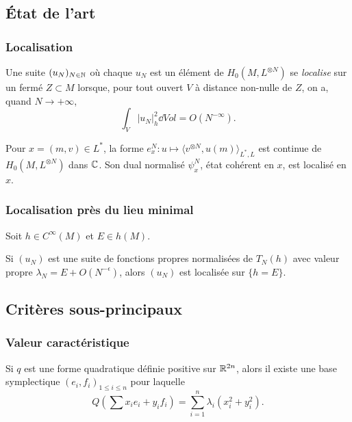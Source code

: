 \documentclass[mathserif]{beamer}
\begin{document}
\subsection{\'Etat de l'art}
\begin{frame}
  \frametitle{Localisation}
  \begin{defn}
    Une suite $(u_N)_{N\in \mathbb{N}}$ où chaque $u_N$ est un élément de
    $H_0(M,L^{\otimes N})$ se \emph{localise} sur un fermé $Z\subset
    M$ lorsque, pour tout ouvert $V$ à distance non-nulle de $Z$, on
    a, quand $N\to +\infty$,
    \[
      \int_V |u_N|^2_h\dd Vol=O(N^{-\infty}).
    \]
  \end{defn}
  \begin{ex}
    Pour $x=(m,v)\in L^*$, la forme $e_x^N:u\mapsto
    \langle v^{\otimes N},u(m)\rangle_{L^*,L}$ est continue de $H_0(M,L^{\otimes N})$ dans $\mathbb{C}$. Son dual
    normalisé $\psi_x^N$, état cohérent en $x$, est localisé en $x$.
  \end{ex}
\end{frame}

\begin{frame}
  \frametitle{Localisation près du lieu minimal}
  \begin{prop}
    Soit $h\in C^{\infty}(M)$ et $E\in h(M)$.

    Si $(u_N)$ est une suite de fonctions propres normalis\'ees de
    $T_N(h)$ avec valeur propre $\lambda_N=E+O(N^{-\epsilon})$, alors $(u_N)$ est
    localisée sur $\{h=E\}$.
  \end{prop}
\end{frame}

\subsection{Critères sous-principaux}
\begin{frame}
  \frametitle{Valeur caractéristique}
  Si $q$ est une forme quadratique définie positive sur $\mathbb{R}^{2n}$,
  alors il existe une base symplectique $(e_i,f_i)_{1\leq i \leq n}$
  pour laquelle
  \[
    Q\left(\sum x_ie_i+y_if_i\right)=\sum_{i=1}^n \lambda_i(x_i^2+y_i^2).
  \]
\end{frame}
\end{document}
